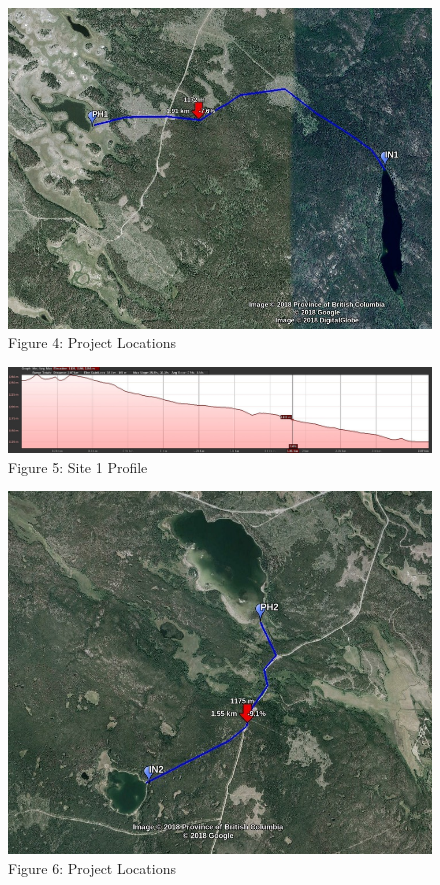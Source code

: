 \documentclass[11pt]{article}
\makeatletter
\def\maxwidth{\ifdim\Gin@nat@width>\linewidth\linewidth
    \else\Gin@nat@width\fi}
\let\Oldincludegraphics\includegraphics
\renewcommand{\includegraphics}[1]{\Oldincludegraphics[width=.8\maxwidth]{#1}}
\makeatother
\begin{document}
\begin{figure}
\centering
\includegraphics{images/Option-1.jpg}
\caption{Figure 4: Project Locations}
\end{figure}

\begin{figure}
\centering
\includegraphics{images/Option1-profile.jpg}
\caption{Figure 5: Site 1 Profile}
\end{figure}

\begin{figure}
\centering
\includegraphics{images/Option-2.jpg}
\caption{Figure 6: Project Locations}
\end{figure}
\end{document}
